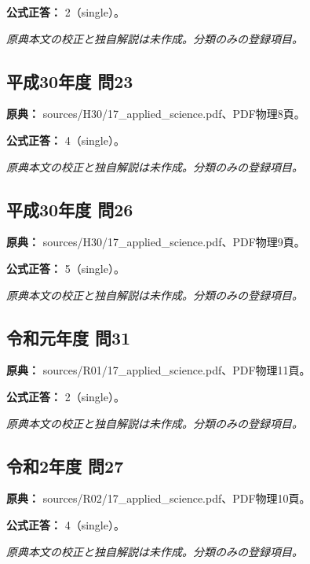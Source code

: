 \textbf{公式正答：} 2（single）。

\par\textit{原典本文の校正と独自解説は未作成。分類のみの登録項目。}

\subsection{平成30年度 問23}
\label{q:h30-reg-applied-23}

\noindent\textbf{原典：} sources/H30/17\_applied\_science.pdf、PDF物理8頁。

\textbf{公式正答：} 4（single）。

\par\textit{原典本文の校正と独自解説は未作成。分類のみの登録項目。}

\subsection{平成30年度 問26}
\label{q:h30-reg-applied-26}

\noindent\textbf{原典：} sources/H30/17\_applied\_science.pdf、PDF物理9頁。

\textbf{公式正答：} 5（single）。

\par\textit{原典本文の校正と独自解説は未作成。分類のみの登録項目。}

\subsection{令和元年度 問31}
\label{q:r01-reg-applied-31}

\noindent\textbf{原典：} sources/R01/17\_applied\_science.pdf、PDF物理11頁。

\textbf{公式正答：} 2（single）。

\par\textit{原典本文の校正と独自解説は未作成。分類のみの登録項目。}

\subsection{令和2年度 問27}
\label{q:r02-reg-applied-27}

\noindent\textbf{原典：} sources/R02/17\_applied\_science.pdf、PDF物理10頁。

\textbf{公式正答：} 4（single）。

\par\textit{原典本文の校正と独自解説は未作成。分類のみの登録項目。}

